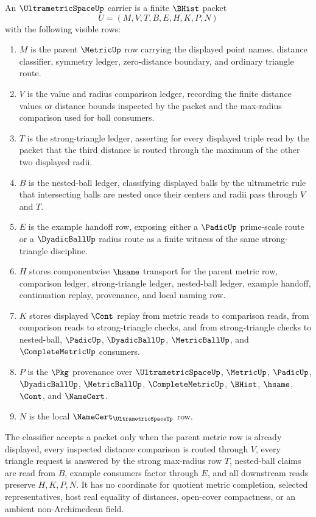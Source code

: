 \begin{definition}
\label{def:ultrametric-space-carrier}
An $\UltrametricSpaceUp$ carrier is a finite $\BHist$ packet
$$
U=(M,V,T,B,E,H,K,P,N)
$$
with the following visible rows:
\begin{enumerate}
\item $M$ is the parent $\MetricUp$ row carrying the displayed point names, distance classifier, symmetry ledger, zero-distance boundary, and ordinary triangle route.
\item $V$ is the value and radius comparison ledger, recording the finite distance values or distance bounds inspected by the packet and the max-radius comparison used for ball consumers.
\item $T$ is the strong-triangle ledger, asserting for every displayed triple read by the packet that the third distance is routed through the maximum of the other two displayed radii.
\item $B$ is the nested-ball ledger, classifying displayed balls by the ultrametric rule that intersecting balls are nested once their centers and radii pass through $V$ and $T$.
\item $E$ is the example handoff row, exposing either a $\PadicUp$ prime-scale route or a $\DyadicBallUp$ radius route as a finite witness of the same strong-triangle discipline.
\item $H$ stores componentwise $\hsame$ transport for the parent metric row, comparison ledger, strong-triangle ledger, nested-ball ledger, example handoff, continuation replay, provenance, and local naming row.
\item $K$ stores displayed $\Cont$ replay from metric reads to comparison reads, from comparison reads to strong-triangle checks, and from strong-triangle checks to nested-ball, $\PadicUp$, $\DyadicBallUp$, $\MetricBallUp$, and $\CompleteMetricUp$ consumers.
\item $P$ is the $\Pkg$ provenance over $\UltrametricSpaceUp$, $\MetricUp$, $\PadicUp$, $\DyadicBallUp$, $\MetricBallUp$, $\CompleteMetricUp$, $\BHist$, $\hsame$, $\Cont$, and $\NameCert$.
\item $N$ is the local $\NameCert_{\UltrametricSpaceUp}$ row.
\end{enumerate}
The classifier accepts a packet only when the parent metric row is already displayed, every inspected distance comparison is routed through $V$, every triangle request is answered by the strong max-radius row $T$, nested-ball claims are read from $B$, example consumers factor through $E$, and all downstream reads preserve $H,K,P,N$. It has no coordinate for quotient metric completion, selected representatives, host real equality of distances, open-cover compactness, or an ambient non-Archimedean field.
\end{definition}

